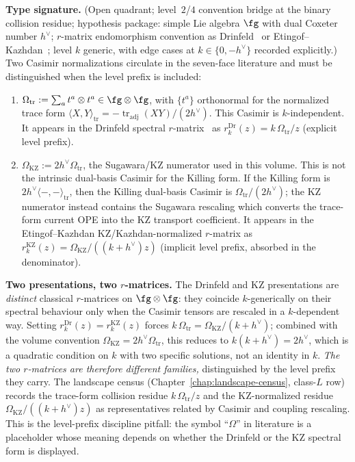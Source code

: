 \begin{lemma}
\label{lem:g1sf-casimir-bridge}
\textbf{Type signature.} (Open quadrant; level~$2$/$4$ convention bridge
at the binary collision residue; hypothesis package: simple Lie algebra
$\fg$ with dual Coxeter number $h^\vee$;
$r$-matrix endomorphism convention as Drinfeld~\cite{Drinfeld85} or
Etingof--Kazhdan~\cite{EK96}; level $k$ generic, with edge cases at
$k\in\{0,-h^\vee\}$ recorded explicitly.)
Two Casimir normalizations circulate in the seven-face literature and
must be distinguished when the level prefix is included:
\begin{enumerate}[label=\textup{(\roman*)}]
\item $\Omega_{\mathrm{tr}} := \sum_a t^a \otimes t^a \in \fg \otimes \fg$,
with $\{t^a\}$ orthonormal for the normalized trace form
$\langle X,Y\rangle_{\mathrm{tr}} = -\operatorname{tr}_{\mathrm{adj}}(XY)/(2h^\vee)$.
This Casimir is $k$-independent. It appears in the Drinfeld
spectral $r$-matrix~\cite{Drinfeld85} as $r^{\mathrm{Dr}}_k(z) = k\,\Omega_{\mathrm{tr}}/z$
\textup{(}explicit level prefix\textup{)}.
\item $\Omega_{\mathrm{KZ}} := 2h^\vee\Omega_{\mathrm{tr}}$, the
Sugawara/KZ numerator used in this volume. This is not the intrinsic
dual-basis Casimir for the Killing form. If the Killing form is
$2h^\vee\langle-,-\rangle_{\mathrm{tr}}$, then the Killing dual-basis
Casimir is $\Omega_{\mathrm{tr}}/(2h^\vee)$; the KZ numerator instead
contains the Sugawara rescaling which converts the trace-form current
OPE into the KZ transport coefficient. It appears in the
Etingof--Kazhdan KZ/Kazhdan-normalized $r$-matrix as
$r^{\mathrm{KZ}}_k(z) = \Omega_{\mathrm{KZ}}/((k+h^\vee)z)$
\textup{(}implicit level prefix, absorbed in the denominator\textup{)}.
\end{enumerate}
\textbf{Two presentations, two $r$-matrices.} The Drinfeld and KZ
presentations are \emph{distinct} classical $r$-matrices on
$\fg \otimes \fg$: they coincide $k$-generically on their spectral
behaviour only when the Casimir tensors are rescaled in a
$k$-dependent way. Setting $r^{\mathrm{Dr}}_k(z) = r^{\mathrm{KZ}}_k(z)$
forces $k\,\Omega_{\mathrm{tr}} = \Omega_{\mathrm{KZ}}/(k+h^\vee)$;
combined with the volume convention
$\Omega_{\mathrm{KZ}} = 2h^\vee\Omega_{\mathrm{tr}}$, this reduces to
$k(k+h^\vee) = 2h^\vee$, which is a quadratic condition on
$k$ with two specific solutions, not an identity in $k$.
\emph{The two $r$-matrices are therefore different families,}
distinguished by the level prefix they carry. The landscape census
\textup{(}Chapter~\ref{chap:landscape-census}, class-$L$ row\textup{)}
records the trace-form collision residue
$k\,\Omega_{\mathrm{tr}}/z$ and the KZ-normalized residue
$\Omega_{\mathrm{KZ}}/((k+h^\vee)z)$ as representatives related by
Casimir and coupling rescaling. This is the level-prefix discipline
pitfall: the symbol ``$\Omega$'' in literature is a placeholder whose
meaning depends on whether the Drinfeld or the KZ spectral form is
displayed.


\end{lemma}
